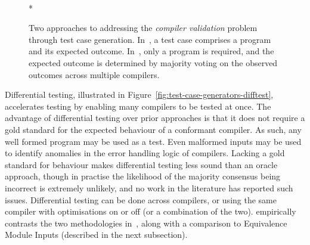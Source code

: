 \begin{figure}
  \centering
  \\*
  \caption[Generating and evaluating compiler test cases]{%
    Two approaches to addressing the \emph{compiler validation} problem through test case generation. In~\protect{}, a test case comprises a program and its expected outcome. In~\protect{}, only a program is required, and the expected outcome is determined by majority voting on the observed outcomes across multiple compilers.%
  }%
  \label{fig:test-case-generators}
\end{figure}

Differential testing, illustrated in Figure~\ref{fig:test-case-generators-difftest}, accelerates testing by enabling many compilers to be tested at once. The advantage of differential testing over prior approaches is that it does not require a gold standard for the expected behaviour of a conformant compiler. As such, any well formed program may be used as a test. Even malformed inputs may be used to identify anomalies in the error handling logic of compilers. Lacking a gold standard for behaviour makes differential testing less sound than an oracle approach, though in practise the likelihood of the majority consensus being incorrect is extremely unlikely, and no work in the literature has reported such issues. Differential testing can be done across compilers, or using the same compiler with optimisations on or off (or a combination of the two). \citeauthor{Chen2014a} empirically contrasts the two methodologies in~\cite{Chen2014a}, along with a comparison to Equivalence Module Inputs (described in the next subsection).

